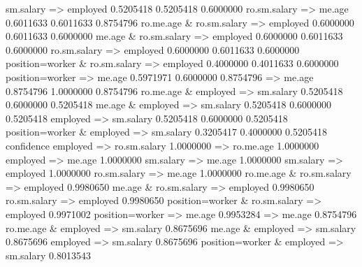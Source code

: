 \begin{Schunk}
\begin{Soutput}
sm.salary => employed                      0.5205418  0.5205418  0.6000000
ro.sm.salary => me.age                     0.6011633  0.6011633  0.8754796
ro.me.age & ro.sm.salary => employed       0.6000000  0.6011633  0.6000000
me.age & ro.sm.salary => employed          0.6000000  0.6011633  0.6000000
ro.sm.salary => employed                   0.6000000  0.6011633  0.6000000
position=worker & ro.sm.salary => employed 0.4000000  0.4011633  0.6000000
position=worker => me.age                  0.5971971  0.6000000  0.8754796
 => me.age                                 0.8754796  1.0000000  0.8754796
ro.me.age & employed => sm.salary          0.5205418  0.6000000  0.5205418
me.age & employed => sm.salary             0.5205418  0.6000000  0.5205418
employed => sm.salary                      0.5205418  0.6000000  0.5205418
position=worker & employed => sm.salary    0.3205417  0.4000000  0.5205418
                                           confidence
employed => ro.sm.salary                    1.0000000
 => ro.me.age                               1.0000000
employed => me.age                          1.0000000
sm.salary => me.age                         1.0000000
sm.salary => employed                       1.0000000
ro.sm.salary => me.age                      1.0000000
ro.me.age & ro.sm.salary => employed        0.9980650
me.age & ro.sm.salary => employed           0.9980650
ro.sm.salary => employed                    0.9980650
position=worker & ro.sm.salary => employed  0.9971002
position=worker => me.age                   0.9953284
 => me.age                                  0.8754796
ro.me.age & employed => sm.salary           0.8675696
me.age & employed => sm.salary              0.8675696
employed => sm.salary                       0.8675696
position=worker & employed => sm.salary     0.8013543
\end{Soutput}
%
% --end: "searchrules"
\end{Schunk}
